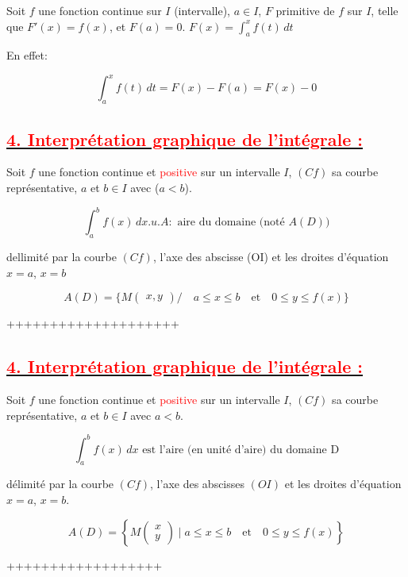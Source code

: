\documentclass[12pt]{article}
\begin{document}
Soit \( f \) une fonction continue sur \( I \) (intervalle), \( a \in I \), \( F \) primitive de \( f \) sur \( I \), telle que \( F'(x) = f(x) \), et \( F(a) = 0 \). \(F(x) = \int_a^x f(t) \, dt \)

En effet:

\[
\int_a^x f(t) \, dt = F(x) - F(a) = F(x) - 0
\]

\subsection*{\underline{\textbf{\textcolor{red}{4. Interprétation graphique de l'intégrale :}}}}

Soit \( f \) une fonction continue et \textcolor{red}{positive} sur un intervalle \( I \), \( (Cf) \) sa courbe représentative, \( a \) et \( b \in I \) avec (\( a < b \)).


\[
\int_a^b f(x) \, dx .u.A  : \text{ aire du domaine (noté } A(D) \text{)}
\]

dellimité par la courbe \( (Cf) \), l'axe des abscisse (OI) et les droites d'équation \( x = a \), \( x = b \)

\[
A(D) = \{M\begin{pmatrix} x,y \end{pmatrix} / \quad a \leq x \leq b \quad \text{et} \quad 0 \leq y \leq f(x)\}
\]

++++++++++++++++++++

\subsection*{\underline{\textbf{\textcolor{red}{4. Interprétation graphique de l'intégrale :}}}}

Soit \( f \) une fonction continue et \textcolor{red}{positive} sur un intervalle \( I \), \( (Cf) \) sa courbe représentative, \( a \) et \( b \in I \) avec \( a < b \).

\[
\int_a^b f(x) \, dx \text{ est l'aire (en unité d'aire) du domaine D}
\]

délimité par la courbe \( (Cf) \), l'axe des abscisses \( (OI) \) et les droites d'équation \( x = a \), \( x = b \).

\[
A(D) = \left\{M\begin{pmatrix} x \\ y \end{pmatrix} \mid a \leq x \leq b \quad \text{et} \quad 0 \leq y \leq f(x) \right\}
\]


++++++++++++++++++
\end{document}
